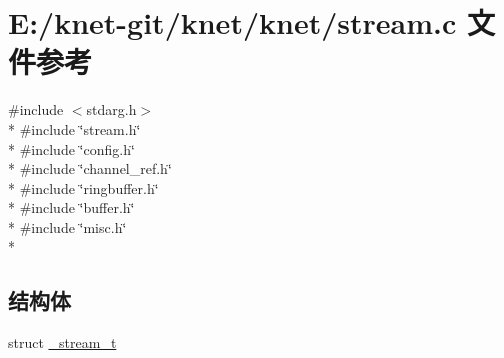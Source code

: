 \hypertarget{a00091}{}\section{E\+:/knet-\/git/knet/knet/stream.c 文件参考}
\label{a00091}
{\ttfamily \#include $<$stdarg.\+h$>$}\\*
{\ttfamily \#include \char`\"{}stream.\+h\char`\"{}}\\*
{\ttfamily \#include \char`\"{}config.\+h\char`\"{}}\\*
{\ttfamily \#include \char`\"{}channel\+\_\+ref.\+h\char`\"{}}\\*
{\ttfamily \#include \char`\"{}ringbuffer.\+h\char`\"{}}\\*
{\ttfamily \#include \char`\"{}buffer.\+h\char`\"{}}\\*
{\ttfamily \#include \char`\"{}misc.\+h\char`\"{}}\\*
\subsection*{结构体}
\begin{DoxyCompactItemize}
\item 
struct \hyperlink{a00034}{\+\_\+stream\+\_\+t}
\end{DoxyCompactItemize}
